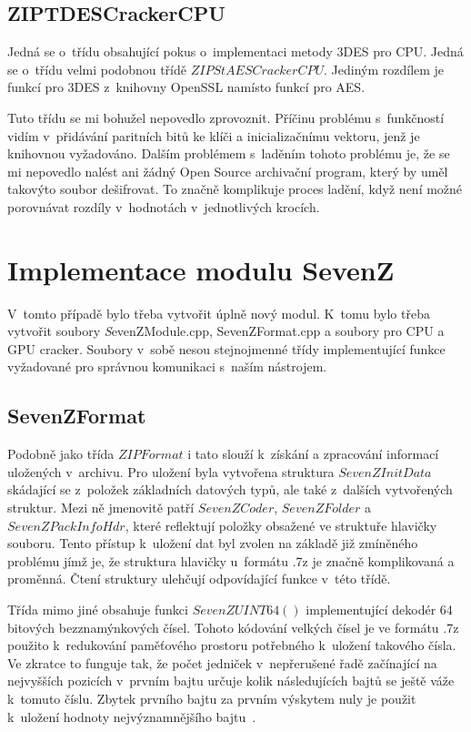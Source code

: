 \subsection{ZIPTDESCrackerCPU}
Jedná se o~třídu obsahující pokus o~implementaci metody 3DES pro CPU. Jedná se o~třídu velmi
podobnou třídě $ZIPStAESCrackerCPU$. Jediným rozdílem je funkcí pro 3DES z~knihovny OpenSSL
namísto funkcí pro AES.

 Tuto třídu se mi bohužel nepovedlo zprovoznit. Příčinu problému s~funkčností vidím v~přidávání
paritních bitů ke klíči a inicializačnímu vektoru, jenž je knihovnou vyžadováno. Dalším
problémem s~laděním tohoto problému je, že se mi nepovedlo nalést ani žádný Open Source
archivační program, který by uměl takovýto soubor dešifrovat. To značně komplikuje proces ladění,
když není možné porovnávat rozdíly v~hodnotách v~jednotlivých krocích.

\section{Implementace modulu SevenZ}
V~tomto případě bylo třeba vytvořit úplně nový modul. K~tomu bylo třeba vytvořit soubory {\textit
SevenZModule.cpp, SevenZFormat.cpp} a soubory pro CPU a GPU cracker. Soubory v~sobě nesou
stejnojmenné třídy implementující funkce vyžadované pro správnou komunikaci s~naším nástrojem.

\subsection{SevenZFormat}
Podobně jako třída $ZIPFormat$ i tato slouží k~získání a zpracování informací uložených
v~archivu. Pro uložení byla vytvořena struktura $SevenZInitData$ skádající se z~položek základních
datových typů, ale také z~dalších vytvořených struktur. Mezi ně jmenovitě patří $SevenZCoder$,
$SevenZFolder$ a $SevenZPackInfoHdr$, které reflektují položky obsažené ve struktuře hlavičky
souboru. Tento přístup k~uložení dat byl zvolen na základě již zmíněného problému jímž je, že
struktura hlavičky u~formátu .7z je značně komplikovaná a proměnná. Čtení struktury ulehčují
odpovídající funkce v~této třídě.

 Třída mimo jiné obsahuje funkci $SevenZUINT64()$ implementující dekodér 64 bitových
bezznamýnkových čísel. Tohoto kódování velkých čísel je ve formátu .7z použito k~redukování
paměťového prostoru potřebného k~uložení takového čísla. Ve zkratce to funguje tak, že počet
jedniček v~nepřerušené řadě začínající na nejvyšších pozicích v~prvním bajtu určuje kolik
následujících bajtů se ještě váže k~tomuto číslu. Zbytek prvního bajtu za prvním výskytem nuly je
použit k~uložení hodnoty nejvýznamnějšího bajtu~\cite{Pavlov:2010}. 

